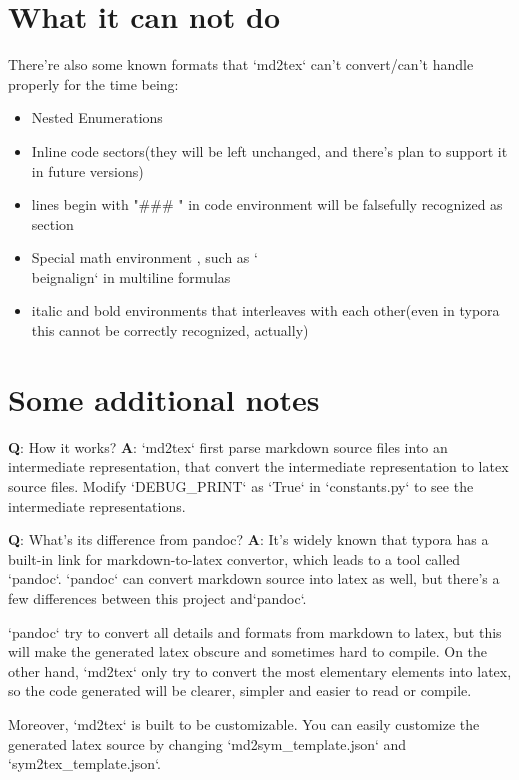 \documentclass[UTF8]{ctexart}
\begin{document}
\section{What it can not do}

There're also some known formats that `md2tex` can't convert/can't handle properly for the time being:

\begin{itemize}	\item Nested Enumerations
	\item Inline code sectors(they will be left unchanged, and there's plan to support it in future versions)
	\item lines begin with "\#\#\# " in code environment will be falsefully recognized as section
	\item Special math environment , such as `\\beign{align}` in multiline formulas
	\item italic and bold environments that interleaves with each other(even in typora this cannot be correctly recognized, actually)
\end{itemize}
\section{Some additional notes}

\textbf{Q}: How it works?
\textbf{A}: `md2tex` first parse markdown source files into an intermediate representation, that convert the intermediate representation to latex source files. Modify `DEBUG\_PRINT` as `True` in `constants.py` to see the intermediate representations.

\textbf{Q}: What's its difference from pandoc?
\textbf{A}: It's widely known that typora has a built-in link for markdown-to-latex convertor, which leads to a tool called `pandoc`. `pandoc` can convert markdown source into latex as well, but there's a few differences between this project and`pandoc`.

`pandoc` try to convert all details and formats from markdown to latex, but this will make the generated latex obscure and sometimes hard to compile. On the other hand, `md2tex` only try to convert the most elementary elements into latex, so the code generated will be clearer, simpler and easier to read or compile. 

Moreover, `md2tex` is built to be customizable. You can easily customize the generated latex source by changing `md2sym\_template.json` and `sym2tex\_template.json`.
\end{document}
